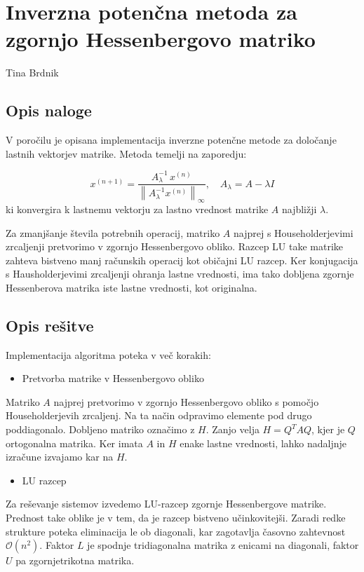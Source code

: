 \documentclass[12pt,a4paper]{article}
\begin{document}
\section{Inverzna potenčna metoda za zgornjo Hessenbergovo matriko}
Tina Brdnik

\subsection{Opis naloge}
V poročilu je opisana implementacija inverzne potenčne metode za določanje lastnih vektorjev matrike.  Metoda temelji na zaporedju: 

\[
x^{(n+1)} = \frac{A_{\lambda}^{-1} \, x^{(n)}}{\left\| A_{\lambda}^{-1} x^{(n)} \right\|_{\infty}}, \quad A_{\lambda} = A - \lambda I
\]
ki konvergira k lastnemu vektorju za lastno vrednost matrike $A$ najbližji \ensuremath{\lambda}.

Za zmanjšanje števila potrebnih operacij, matriko $A$ najprej s Householderjevimi zrcaljenji pretvorimo v zgornjo Hessenbergovo obliko.  Razcep LU take matrike zahteva bistveno manj računskih operacij kot običajni LU razcep. Ker konjugacija s Hausholderjevimi zrcaljenji ohranja lastne vrednosti, ima tako dobljena zgornje Hessenberova matrika iste lastne vrednosti, kot originalna. 

\subsection{Opis rešitve}
Implementacija algoritma poteka v več korakih:

\begin{itemize}
\item[1. ] Pretvorba matrike v Hessenbergovo obliko  

\end{itemize}
Matriko $A$ najprej pretvorimo v zgornjo Hessenbergovo obliko s pomočjo Householderjevih zrcaljenj. Na ta način odpravimo elemente pod drugo poddiagonalo. Dobljeno matriko označimo z $H$. Zanjo velja $H = Q^T A Q$, kjer je $Q$ ortogonalna matrika. Ker imata $A$ in $H$ enake lastne vrednosti, lahko nadaljnje izračune izvajamo kar na $H$.

\begin{itemize}
\item[2. ] LU razcep  

\end{itemize}
Za reševanje sistemov izvedemo LU-razcep zgornje Hessenbergove matrike.   Prednost take oblike je v tem, da je razcep bistveno učinkovitejši.   Zaradi redke strukture poteka eliminacija le ob diagonali, kar zagotavlja časovno zahtevnost $\mathcal{O}(n^2)$.   Faktor $L$ je spodnje tridiagonalna matrika z enicami na diagonali, faktor $U$ pa zgornjetrikotna matrika.
\end{document}
